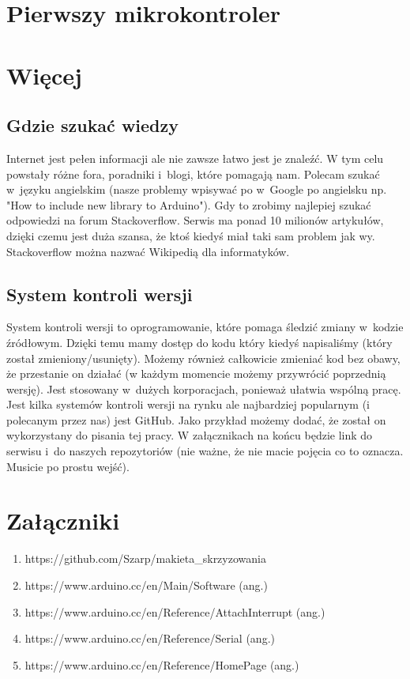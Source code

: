 \documentclass[a4paper,12pt, twoside]{article}
\let\oldsection\section		%
\renewcommand\section{\clearpage\oldsection}%
\begin{document}
\section{Pierwszy mikrokontroler}
		

\section {Więcej}

\subsection {Gdzie szukać wiedzy}
Internet jest pełen informacji ale nie zawsze łatwo jest je znaleźć. W tym celu powstały różne fora, poradniki i~blogi, które pomagają nam. Polecam szukać w~języku angielskim (nasze problemy wpisywać po w~Google po angielsku np. "How to include new library to Arduino"). Gdy to zrobimy najlepiej szukać odpowiedzi na forum Stackoverflow. Serwis ma ponad 10 milionów artykułów, dzięki czemu jest duża szansa, że ktoś kiedyś miał taki sam problem jak wy. Stackoverflow można nazwać Wikipedią dla informatyków. 
\subsection{System kontroli wersji}
System kontroli wersji to oprogramowanie, które pomaga śledzić zmiany w~kodzie źródłowym.
Dzięki temu mamy dostęp do kodu który kiedyś napisaliśmy (który został zmieniony/usunięty). Możemy również całkowicie zmieniać kod bez obawy, że przestanie on działać (w każdym momencie możemy przywrócić poprzednią wersję). Jest stosowany w~dużych korporacjach, ponieważ ułatwia wspólną pracę. Jest kilka systemów kontroli wersji na rynku ale najbardziej popularnym (i polecanym przez nas) jest GitHub. Jako przykład możemy dodać, że został on wykorzystany do pisania tej pracy. W załącznikach na końcu będzie link do serwisu i~do naszych repozytoriów (nie ważne, że nie macie pojęcia co to oznacza. Musicie po prostu wejść).
\cite{SKW-Wiki, Git-Wiki}

\section*{Załączniki}
\begin{enumerate}
	\item \label{itm:Git_makieta} https://github.com/Szarp/makieta\_skrzyzowania
	\item \label{itm:Download_Arduino} https://www.arduino.cc/en/Main/Software (ang.)
	\item \label{itm:InterruptPin} https://www.arduino.cc/en/Reference/AttachInterrupt (ang.)
	\item \label{itm:Serial} https://www.arduino.cc/en/Reference/Serial (ang.)
	\item \label{itm:Ref} https://www.arduino.cc/en/Reference/HomePage (ang.)
\end{enumerate}
\end{document}
